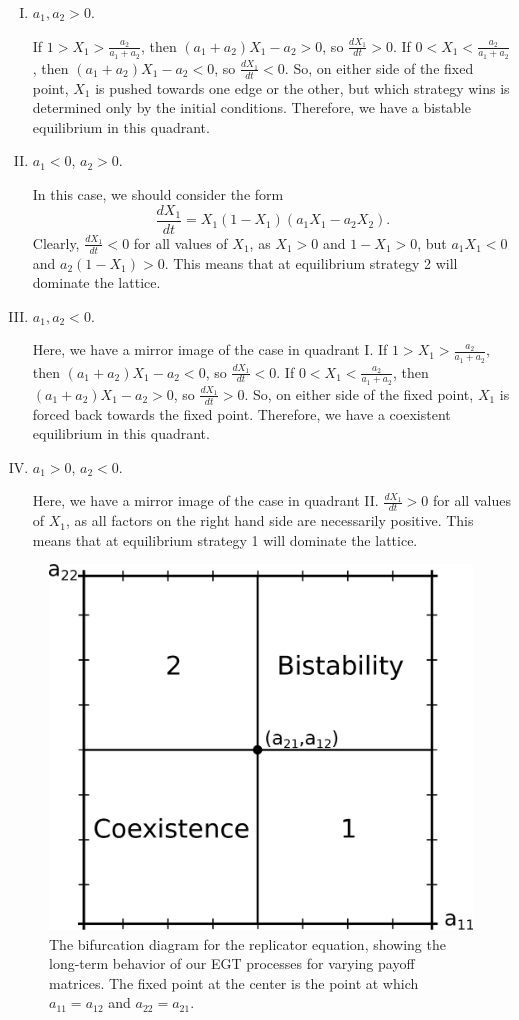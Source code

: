 \documentclass[notitlepage,reqno]{amsart}
\begin{document}
\begin{enumerate}[I.]
\item $a_1, a_2 > 0$.

If $1 > X_1 > \frac{a_2}{a_1+a_2}$, then $(a_1+a_2)X_1 - a_2 > 0$, so
  $\frac{dX_1}{dt} > 0$. If $0 < X_1 < \frac{a_2}{a_1+a_2}$, then $(a_1+a_2)X_1 - a_2 < 0$, so
  $\frac{dX_1}{dt} < 0$. So, on
  either side of the fixed point, $X_1$ is pushed towards one edge or
  the other, but which strategy wins is determined only by the
  initial conditions. Therefore, we have a bistable equilibrium in
  this quadrant.

\item $a_1<0$, $a_2>0$.

  In this case, we should consider the form
\[
    \frac{dX_1}{dt} = X_1(1-X_1)(a_1X_1 - a_2X_2).
\]
Clearly, $\frac{dX_1}{dt} < 0$ for all values of $X_1$, as $X_1>0$ and
$1-X_1>0$, but $a_1X_1 < 0$ and $a_2(1-X_1) > 0$. This means that at
equilibrium strategy 2 will dominate the lattice.

\item $a_1,a_2<0$.

  Here, we have a mirror image of the case in quadrant I. If $1 > X_1 > \frac{a_2}{a_1+a_2}$, then $(a_1+a_2)X_1 - a_2 < 0$, so
  $\frac{dX_1}{dt} < 0$. If $0 < X_1 < \frac{a_2}{a_1+a_2}$, then $(a_1+a_2)X_1 - a_2 > 0$, so
  $\frac{dX_1}{dt} > 0$. So, on either side of the fixed point, $X_1$ is forced
  back towards the fixed point. Therefore, we have a coexistent
  equilibrium in this quadrant.

\item $a_1>0$, $a_2<0$.

  Here, we have a mirror image of the case in quadrant
  II. $\frac{dX_1}{dt} > 0$ for all values of $X_1$, as all factors on
  the right hand side are necessarily positive. This means that at equilibrium strategy 1 will dominate the lattice.

\end{enumerate}

\begin{figure}[h]
\includegraphics[width=.5\textwidth]{./images/replicator_bifurcation_diagram.eps}
\caption{The bifurcation diagram for the replicator equation, showing
  the long-term behavior of our EGT processes for varying payoff
  matrices. The fixed point at the center is the point at which
  $a_{11} = a_{12}$ and $a_{22} = a_{21}$.}
\label{fig:replicatorbifurcationdiagram}
\end{figure}
\end{document}
